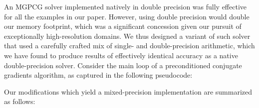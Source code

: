 An MGPCG solver implemented natively in double precision was fully effective for all the examples in our paper. However, using double precision would double our memory footprint, which
was a significant concession given our pursuit of exceptionally high-resolution domains. We thus designed a variant of such solver that used a carefully crafted mix of single- and
double-precision arithmetic, which we have found to produce results of effectively identical accuracy as a native double-precision solver. Consider the main loop of a 
preconditioned conjugate gradients algorithm, as captured in the following pseudocode:
\begin{figure}[h]
\center
{}
\end{figure}
Our modifications which yield a mixed-precision implementation are summarized as follows:
